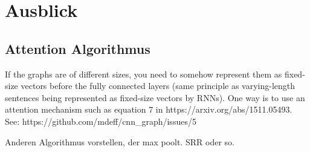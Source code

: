 \chapter{Ausblick}

\section{Attention Algorithmus}

If the graphs are of different sizes, you need to somehow represent them as fixed-size vectors before the fully connected layers (same principle as varying-length sentences being represented as fixed-size vectors by RNNs).
One way is to use an attention mechanism such as equation 7 in https://arxiv.org/abs/1511.05493.
See: https://github.com/mdeff/cnn_graph/issues/5

Anderen Algorithmus vorstellen, der max poolt. SRR oder so.
